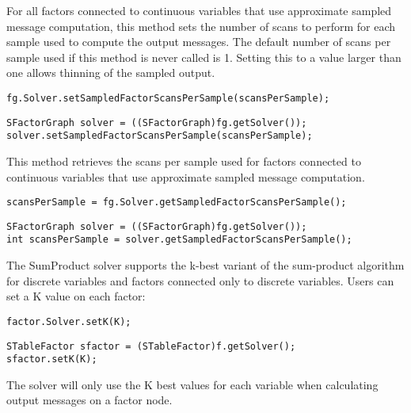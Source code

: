 For all factors connected to continuous variables that use approximate sampled message computation, this method sets the number of scans to perform for each sample used to compute the output messages.  The default number of scans per sample used if this method is never called is 1.  Setting this to a value larger than one allows thinning of the sampled output.

\ifmatlab
\begin{lstlisting}
fg.Solver.setSampledFactorScansPerSample(scansPerSample);
\end{lstlisting}
\fi

\ifjava
\begin{lstlisting}
SFactorGraph solver = ((SFactorGraph)fg.getSolver());
solver.setSampledFactorScansPerSample(scansPerSample);
\end{lstlisting}
\fi


This method retrieves the scans per sample used for factors connected to continuous variables that use approximate sampled message computation.

\ifmatlab
\begin{lstlisting}
scansPerSample = fg.Solver.getSampledFactorScansPerSample();
\end{lstlisting}
\fi

\ifjava
\begin{lstlisting}
SFactorGraph solver = ((SFactorGraph)fg.getSolver());
int scansPerSample = solver.getSampledFactorScansPerSample();
\end{lstlisting}
\fi




The SumProduct solver supports the k-best variant of the sum-product algorithm for discrete variables and factors connected only to discrete variables.  Users can set a K value on each factor:

\ifmatlab
\begin{lstlisting}
factor.Solver.setK(K);
\end{lstlisting}
\fi

\ifjava
\begin{lstlisting}
STableFactor sfactor = (STableFactor)f.getSolver();
sfactor.setK(K);
\end{lstlisting}
\fi


The solver will only use the K best values for each variable when calculating output messages on a factor node.

